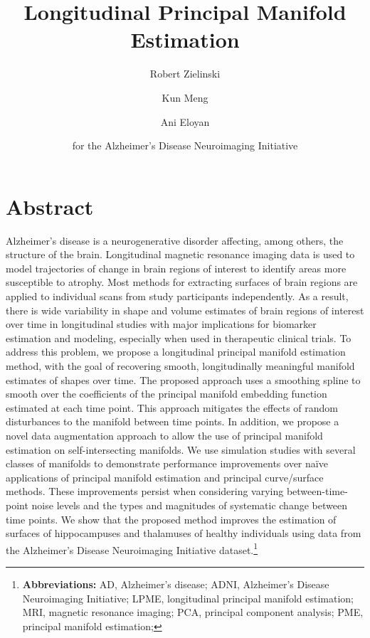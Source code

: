 \documentclass[11pt,reqno]{article}
\theoremstyle{definition}
\begin{document}
\title{Longitudinal Principal Manifold Estimation}
\author[1]{Robert Zielinski}
\author[2]{Kun Meng}
\author[1]{Ani Eloyan}
\author[*]{for the Alzheimer’s Disease Neuroimaging Initiative}



\maketitle

\doublespacing

\section*{Abstract}

Alzheimer's disease is a neurogenerative disorder affecting, among others, the structure of the brain. Longitudinal magnetic resonance imaging data is used to model trajectories of change in brain regions of interest to identify areas more susceptible to atrophy. Most methods for extracting surfaces of brain regions are applied to individual scans from study participants independently. As a result, there is wide variability in shape and volume estimates of brain regions of interest over time in longitudinal studies with major implications for biomarker estimation and modeling, especially when used in therapeutic clinical trials. To address this problem, we propose a longitudinal principal manifold estimation method, with the goal of recovering smooth, longitudinally meaningful manifold estimates of shapes over time. The proposed approach uses a smoothing spline to smooth over the coefficients of the principal manifold embedding function estimated at each time point. This approach mitigates the effects of random disturbances to the manifold between time points. In addition, we propose a novel data augmentation approach to allow the use of principal manifold estimation on self-intersecting manifolds. We use simulation studies with several classes of manifolds to demonstrate performance improvements over naïve applications of principal manifold estimation and principal curve/surface methods. These improvements persist when considering varying between-time-point noise levels and the types and magnitudes of systematic change between time points. We show that the proposed method improves the estimation of surfaces of hippocampuses and thalamuses of healthy individuals using data from the Alzheimer’s Disease Neuroimaging Initiative dataset.\footnote{\textbf{Abbreviations:} AD, Alzheimer's disease; ADNI, Alzheimer's Disease Neuroimaging Initiative; LPME, longitudinal principal manifold estimation; MRI, magnetic resonance imaging; PCA, principal component analysis; PME, principal manifold estimation;}
\end{document}
